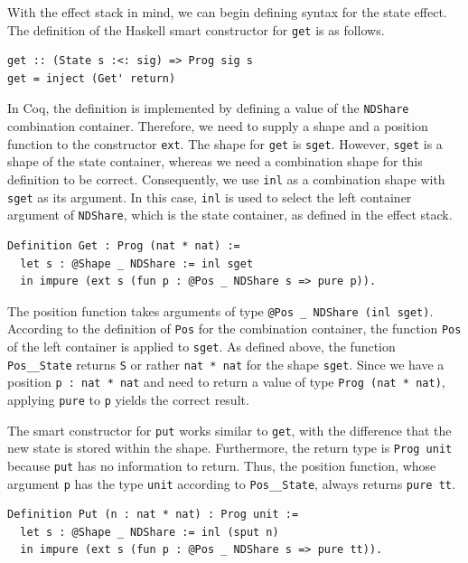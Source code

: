 \documentclass[a4paper, 11pt, fleqn, twoside]{scrreprt}
\newcommand{\hinl}[1]{\texttt{#1}}
\newcommand{\cinl}[1]{\texttt{#1}}
\begin{document}
With the effect stack in mind, we can begin defining syntax for the state effect.
The definition of the Haskell smart constructor for \hinl{get} is as follows.

\begin{verbatim}
get :: (State s :<: sig) => Prog sig s
get = inject (Get' return)
\end{verbatim}

In Coq, the definition is implemented by defining a value of the \cinl{NDShare} combination container.
Therefore, we need to supply a shape and a position function to the constructor \cinl{ext}.
The shape for \hinl{get} is \cinl{sget}.
However, \cinl{sget} is a shape of the state container, whereas we need a combination shape for this definition to be correct.
Consequently, we use \cinl{inl} as a combination shape with \cinl{sget} as its argument.
In this case, \cinl{inl} is used to select the left container argument of \cinl{NDShare}, which is the state container, as defined in the effect stack.

\begin{verbatim}
Definition Get : Prog (nat * nat) :=
  let s : @Shape _ NDShare := inl sget
  in impure (ext s (fun p : @Pos _ NDShare s => pure p)).
\end{verbatim}

The position function takes arguments of type \cinl{@Pos _ NDShare (inl sget)}.
According to the definition of \cinl{Pos} for the combination container, the function \cinl{Pos} of the left container is applied to \cinl{sget}.
As defined above, the function \cinl{Pos__State} returns \cinl{S} or rather \cinl{nat * nat} for the shape \cinl{sget}.
Since we have a position \cinl{p : nat * nat} and need to return a value of type \cinl{Prog (nat * nat)}, applying \cinl{pure} to \cinl{p} yields the correct result.

The smart constructor for \hinl{put} works similar to \hinl{get}, with the difference that the new state is stored within the shape.
Furthermore, the return type is \cinl{Prog unit} because \hinl{put} has no information to return.
Thus, the position function, whose argument \cinl{p} has the type \cinl{unit} according to \cinl{Pos__State}, always returns \cinl{pure tt}.

\begin{verbatim}
Definition Put (n : nat * nat) : Prog unit :=
  let s : @Shape _ NDShare := inl (sput n)
  in impure (ext s (fun p : @Pos _ NDShare s => pure tt)).
\end{verbatim}
\end{document}
